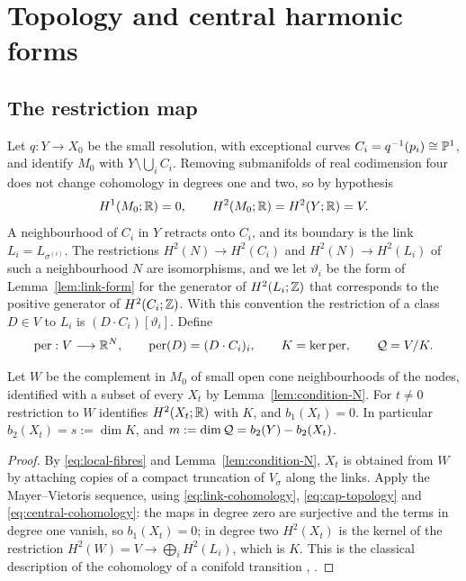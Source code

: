 \section{Topology and central harmonic forms}\label{sec:harmonic}

\subsection{The restriction map}
Let $q:Y\to X_0$ be the small resolution, with exceptional curves
$C_i=q^{-1}(p_i)\cong\mathbb P^1$, and identify $M_0$ with
$Y\setminus\bigcup_iC_i$. Removing submanifolds of real codimension four
does not change cohomology in degrees one and two, so by hypothesis
\begin{equation}\label{eq:central-cohomology}
 H^1(M_0;\mathbb R)=0,\qquad H^2(M_0;\mathbb R)=H^2(Y;\mathbb R)=V .
\end{equation}
A neighbourhood of $C_i$ in $Y$ retracts onto $C_i$, and its boundary is
the link $L_i=L_{\sigma^{(i)}}$. The restrictions $H^2(N)\to H^2(C_i)$ and $H^2(N)\to H^2(L_i)$ of such a
neighbourhood $N$ are isomorphisms, and we let $\vartheta_i$ be the form of
Lemma~\ref{lem:link-form} for the generator of $H^2(L_i;\mathbb Z)$ that
corresponds to the positive generator of $H^2(C_i;\mathbb Z)$. With this
convention the restriction of a class $D\in V$ to $L_i$ is
$(D\cdot C_i)[\vartheta_i]$. Define
\begin{equation}\label{eq:restriction}
 \operatorname{per}:V\longrightarrow\mathbb R^N,\qquad \operatorname{per}(D)=(D\cdot C_i)_{i},\qquad
 K=\ker\operatorname{per},\qquad\mathcal Q=V/K .
\end{equation}

\begin{lemma}\label{lem:topology}
Let $W$ be the complement in $M_0$ of small open cone neighbourhoods of
the nodes, identified with a subset of every $X_t$ by
Lemma~\ref{lem:condition-N}. For $t\ne0$ restriction to $W$ identifies
$H^2(X_t;\mathbb R)$ with $K$, and $b_1(X_t)=0$. In particular $b_2(X_t)=s:=\dim K$, and
$m:=\dim\mathcal Q=b_2(Y)-b_2(X_t)$.
\end{lemma}
\begin{proof}
By \eqref{eq:local-fibres} and Lemma~\ref{lem:condition-N},
$X_t$ is obtained from $W$ by attaching copies of a compact truncation of
$V_\sigma$ along the links. Apply the Mayer--Vietoris sequence, using
\eqref{eq:link-cohomology}, \eqref{eq:cap-topology} and
\eqref{eq:central-cohomology}: the maps in degree zero are
surjective and the terms in degree one vanish, so $b_1(X_t)=0$; in
degree two $H^2(X_t)$ is the kernel of the restriction
$H^2(W)=V\to\bigoplus_iH^2(L_i)$, which is $K$. This is the classical description of the cohomology of a conifold
transition \cite[Theorem~3.2]{rossi}, \cite[Section~1]{lee-lin-wang}.
\end{proof}

